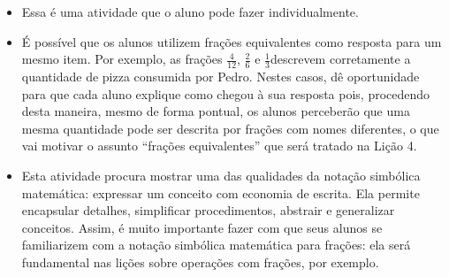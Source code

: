   \vspace{.1cm}

  \vspace{.1cm}

  \begin{itemize} %
    \item       Essa é uma atividade que o aluno pode fazer individualmente.
    \item       É possível que os alunos utilizem frações equivalentes como resposta para um mesmo item. Por exemplo, as frações       $\frac{4}{12}$,       $\frac{2}{6}$ e       $\frac{1}{3}$descrevem corretamente a quantidade de pizza consumida por Pedro. Nestes casos, dê oportunidade para que cada aluno explique como chegou à sua resposta pois, procedendo desta maneira, mesmo de forma pontual, os alunos perceberão que uma mesma quantidade pode ser descrita por frações com nomes diferentes, o que vai motivar o assunto ``frações equivalentes''     que será tratado na Lição 4.
    \item       Esta atividade procura mostrar uma das qualidades da notação simbólica matemática: expressar um conceito com economia de escrita. Ela permite encapsular detalhes, simplificar procedimentos, abstrair e generalizar conceitos. Assim, é muito importante fazer com que seus alunos se familiarizem com a notação simbólica matemática para frações: ela será fundamental nas lições sobre operações com frações, por exemplo.
\end{itemize} %





%

